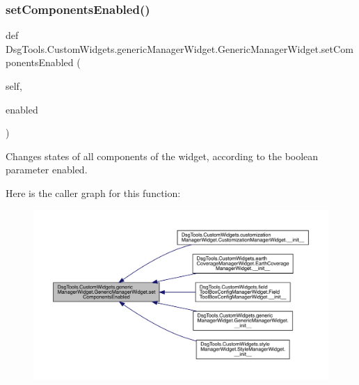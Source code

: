 \subsubsection{\texorpdfstring{set\+Components\+Enabled()}{setComponentsEnabled()}}
{\footnotesize\ttfamily def Dsg\+Tools.\+Custom\+Widgets.\+generic\+Manager\+Widget.\+Generic\+Manager\+Widget.\+set\+Components\+Enabled (\begin{DoxyParamCaption}\item[{}]{self,  }\item[{}]{enabled }\end{DoxyParamCaption})}

\begin{DoxyVerb}Changes states of all components of the widget, according to the boolean parameter enabled.
\end{DoxyVerb}
 Here is the caller graph for this function\+:
\nopagebreak
\begin{figure}[H]
\begin{center}
\leavevmode
\includegraphics[width=350pt]{class_dsg_tools_1_1_custom_widgets_1_1generic_manager_widget_1_1_generic_manager_widget_af23713b1e8ad7e838c60c2c94109c026_icgraph}
\end{center}
\end{figure}
\mbox{\label{class_dsg_tools_1_1_custom_widgets_1_1generic_manager_widget_1_1_generic_manager_widget_a89b9e70f470c910e1edae2f8e3e4f28e}} 
